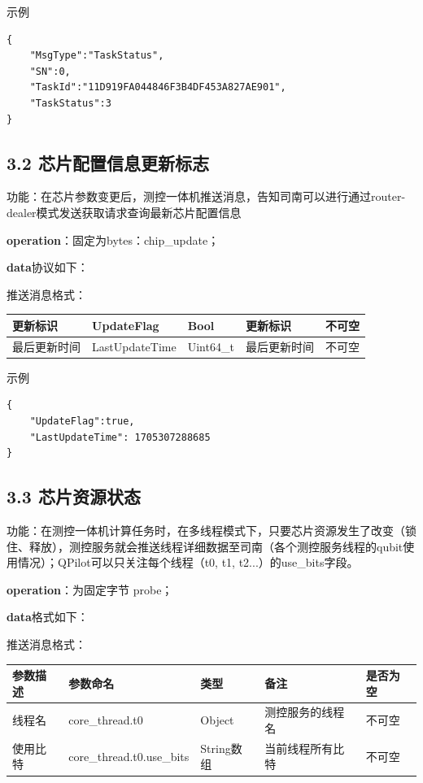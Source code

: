 \documentclass{ctexart}
\begin{document}
示例

\begin{verbatim}{
    "MsgType":"TaskStatus",
    "SN":0,
 	"TaskId":"11D919FA044846F3B4DF453A827AE901",
    "TaskStatus":3
}\end{verbatim}

\subsection{3.2 芯片配置信息更新标志}

功能：在芯片参数变更后，测控一体机推送消息，告知司南可以进行通过router-dealer模式发送获取请求查询最新芯片配置信息

\textbf{operation}：固定为bytes：chip_update；

\textbf{data}协议如下：

推送消息格式：

\begin{longtable}{|l|l|l|l|l|}
\hline
\textbf{更新标识} & \textbf{UpdateFlag} & \textbf{Bool} & \textbf{更新标识} & \textbf{不可空} \\
\hline
最后更新时间 & LastUpdateTime & Uint64_t & 最后更新时间 & 不可空 \\
\hline
\end{longtable}

示例

\begin{verbatim}{
    "UpdateFlag":true,
    "LastUpdateTime": 1705307288685
}\end{verbatim}

\subsection{3.3 芯片资源状态}

功能：在测控一体机计算任务时，在多线程模式下，只要芯片资源发生了改变（锁住、释放），测控服务就会推送线程详细数据至司南（各个测控服务线程的qubit使用情况）；QPilot可以只关注每个线程（t0, t1, t2...）的use_bits字段。

\textbf{operation}：为固定字节 probe；

\textbf{data}格式如下：

推送消息格式：

\begin{longtable}{|l|l|l|l|l|}
\hline
\textbf{\textbf{参数描述}} & \textbf{\textbf{参数命名}} & \textbf{\textbf{类型}} & \textbf{\textbf{备注}} & \textbf{\textbf{是否为空}} \\
\hline
线程名 & core_thread.t0 & Object & 测控服务的线程名 & 不可空 \\
使用比特 & core_thread.t0.use_bits & String数组 & 当前线程所有比特 & 不可空 \\
\hline
\end{longtable}
\end{document}
